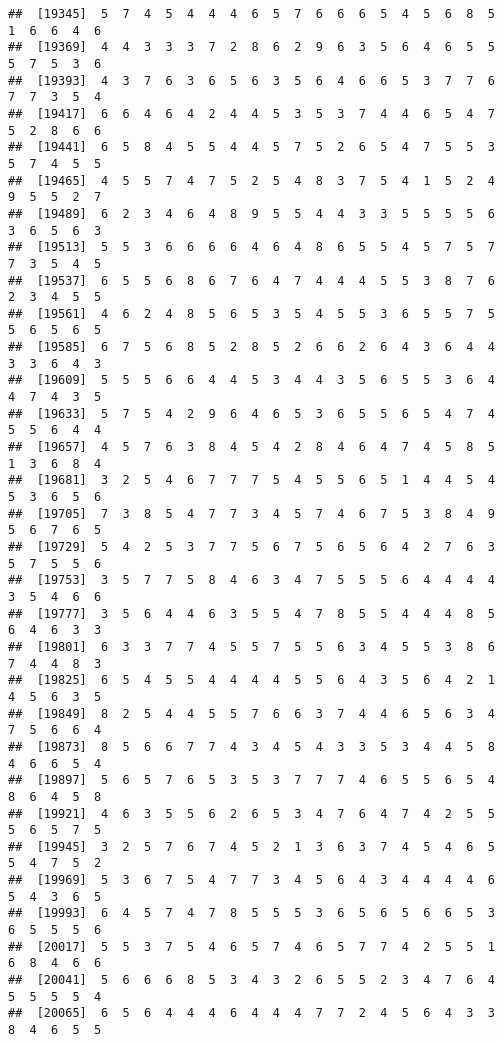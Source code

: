 \documentclass[
]{book}
\begin{document}
\begin{verbatim}
##  [19345]  5  7  4  5  4  4  4  6  5  7  6  6  6  5  4  5  6  8  5  1  6  6  4  6
##  [19369]  4  4  3  3  3  7  2  8  6  2  9  6  3  5  6  4  6  5  5  5  7  5  3  6
##  [19393]  4  3  7  6  3  6  5  6  3  5  6  4  6  6  5  3  7  7  6  7  7  3  5  4
##  [19417]  6  6  4  6  4  2  4  4  5  3  5  3  7  4  4  6  5  4  7  5  2  8  6  6
##  [19441]  6  5  8  4  5  5  4  4  5  7  5  2  6  5  4  7  5  5  3  5  7  4  5  5
##  [19465]  4  5  5  7  4  7  5  2  5  4  8  3  7  5  4  1  5  2  4  9  5  5  2  7
##  [19489]  6  2  3  4  6  4  8  9  5  5  4  4  3  3  5  5  5  5  6  3  6  5  6  3
##  [19513]  5  5  3  6  6  6  6  4  6  4  8  6  5  5  4  5  7  5  7  7  3  5  4  5
##  [19537]  6  5  5  6  8  6  7  6  4  7  4  4  4  5  5  3  8  7  6  2  3  4  5  5
##  [19561]  4  6  2  4  8  5  6  5  3  5  4  5  5  3  6  5  5  7  5  5  6  5  6  5
##  [19585]  6  7  5  6  8  5  2  8  5  2  6  6  2  6  4  3  6  4  4  3  3  6  4  3
##  [19609]  5  5  5  6  6  4  4  5  3  4  4  3  5  6  5  5  3  6  4  4  7  4  3  5
##  [19633]  5  7  5  4  2  9  6  4  6  5  3  6  5  5  6  5  4  7  4  5  5  6  4  4
##  [19657]  4  5  7  6  3  8  4  5  4  2  8  4  6  4  7  4  5  8  5  1  3  6  8  4
##  [19681]  3  2  5  4  6  7  7  7  5  4  5  5  6  5  1  4  4  5  4  5  3  6  5  6
##  [19705]  7  3  8  5  4  7  7  3  4  5  7  4  6  7  5  3  8  4  9  5  6  7  6  5
##  [19729]  5  4  2  5  3  7  7  5  6  7  5  6  5  6  4  2  7  6  3  5  7  5  5  6
##  [19753]  3  5  7  7  5  8  4  6  3  4  7  5  5  5  6  4  4  4  4  3  5  4  6  6
##  [19777]  3  5  6  4  4  6  3  5  5  4  7  8  5  5  4  4  4  8  5  6  4  6  3  3
##  [19801]  6  3  3  7  7  4  5  5  7  5  5  6  3  4  5  5  3  8  6  7  4  4  8  3
##  [19825]  6  5  4  5  5  4  4  4  4  5  5  6  4  3  5  6  4  2  1  4  5  6  3  5
##  [19849]  8  2  5  4  4  5  5  7  6  6  3  7  4  4  6  5  6  3  4  7  5  6  6  4
##  [19873]  8  5  6  6  7  7  4  3  4  5  4  3  3  5  3  4  4  5  8  4  6  6  5  4
##  [19897]  5  6  5  7  6  5  3  5  3  7  7  7  4  6  5  5  6  5  4  8  6  4  5  8
##  [19921]  4  6  3  5  5  6  2  6  5  3  4  7  6  4  7  4  2  5  5  5  6  5  7  5
##  [19945]  3  2  5  7  6  7  4  5  2  1  3  6  3  7  4  5  4  6  5  5  4  7  5  2
##  [19969]  5  3  6  7  5  4  7  7  3  4  5  6  4  3  4  4  4  4  6  5  4  3  6  5
##  [19993]  6  4  5  7  4  7  8  5  5  5  3  6  5  6  5  6  6  5  3  6  5  5  5  6
##  [20017]  5  5  3  7  5  4  6  5  7  4  6  5  7  7  4  2  5  5  1  6  8  4  6  6
##  [20041]  5  6  6  6  8  5  3  4  3  2  6  5  5  2  3  4  7  6  4  5  5  5  5  4
##  [20065]  6  5  6  4  4  4  6  4  4  4  7  7  2  4  5  6  4  3  3  8  4  6  5  5

\end{verbatim}
\end{document}
